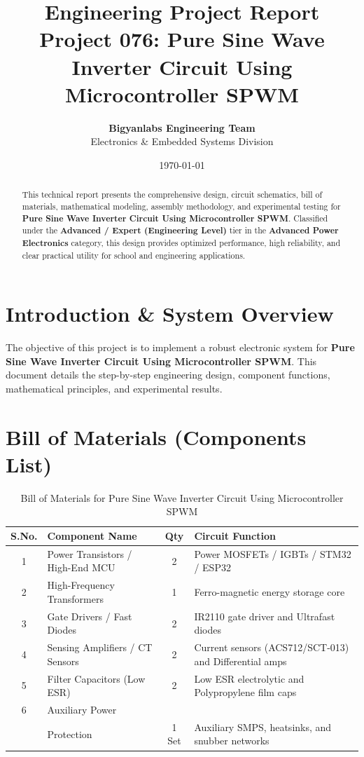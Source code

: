 \documentclass[11pt,a4paper]{article}
\title{\textbf{\Huge Engineering Project Report}\\[0.5em] \Large Project 076: Pure Sine Wave Inverter Circuit Using Microcontroller SPWM}
\author{\textbf{Bigyanlabs Engineering Team}\\ Electronics \& Embedded Systems Division}
\date{\today}
\begin{document}
\maketitle
\thispagestyle{empty}

\begin{abstract}
This technical report presents the comprehensive design, circuit schematics, bill of materials, mathematical modeling, assembly methodology, and experimental testing for \textbf{Pure Sine Wave Inverter Circuit Using Microcontroller SPWM}. Classified under the \textbf{Advanced / Expert (Engineering Level)} tier in the \textbf{Advanced Power Electronics} category, this design provides optimized performance, high reliability, and clear practical utility for school and engineering applications.
\end{abstract}

\newpage
\tableofcontents
\newpage

\section{Introduction \& System Overview}
The objective of this project is to implement a robust electronic system for \textbf{Pure Sine Wave Inverter Circuit Using Microcontroller SPWM}. This document details the step-by-step engineering design, component functions, mathematical principles, and experimental results.

\section{Bill of Materials (Components List)}
\begin{table}[h!]
\centering
\caption{Bill of Materials for Pure Sine Wave Inverter Circuit Using Microcontroller SPWM}
\vspace{0.5em}
\begin{tabular}{clcp{7cm}}
\toprule
\textbf{S.No.} & \textbf{Component Name} & \textbf{Qty} & \textbf{Circuit Function} \\
\midrule
1 & Power Transistors / High-End MCU & 2 & Power MOSFETs / IGBTs / STM32 / ESP32 \\
2 & High-Frequency Transformers & 1 & Ferro-magnetic energy storage core \\
3 & Gate Drivers / Fast Diodes & 2 & IR2110 gate driver and Ultrafast diodes \\
4 & Sensing Amplifiers / CT Sensors & 2 & Current sensors (ACS712/SCT-013) and Differential amps \\
5 & Filter Capacitors (Low ESR) & 2 & Low ESR electrolytic and Polypropylene film caps \\
6 & Auxiliary Power \\& Protection & 1 Set & Auxiliary SMPS, heatsinks, and snubber networks \\
\bottomrule
\end{tabular}
\end{table}
\end{document}
